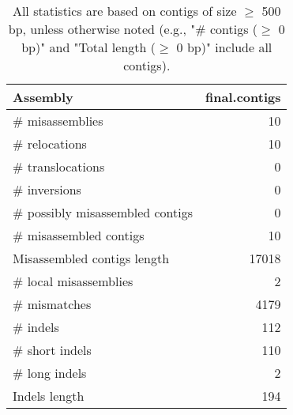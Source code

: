 \documentclass[12pt,a4paper]{article}
\begin{document}
\begin{table}[ht]
\begin{center}
\caption{All statistics are based on contigs of size $\geq$ 500 bp, unless otherwise noted (e.g., "\# contigs ($\geq$ 0 bp)" and "Total length ($\geq$ 0 bp)" include all contigs).}
\begin{tabular}{|l*{1}{|r}|}
\hline
Assembly & final.contigs \\ \hline
\# misassemblies & 10 \\ \hline
\hspace{5mm}\# relocations & 10 \\ \hline
\hspace{5mm}\# translocations & 0 \\ \hline
\hspace{5mm}\# inversions & 0 \\ \hline
\# possibly misassembled contigs & 0 \\ \hline
\# misassembled contigs & 10 \\ \hline
Misassembled contigs length & 17018 \\ \hline
\# local misassemblies & 2 \\ \hline
\# mismatches & 4179 \\ \hline
\# indels & 112 \\ \hline
\hspace{5mm}\# short indels & 110 \\ \hline
\hspace{5mm}\# long indels & 2 \\ \hline
Indels length & 194 \\ \hline
\end{tabular}
\end{center}
\end{table}
\end{document}
